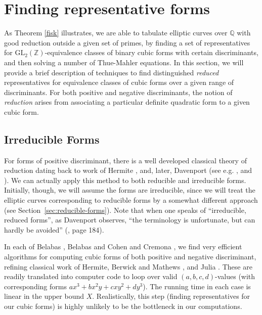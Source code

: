 \documentclass[11pt]{report}
\theoremstyle{definition}
\begin{document}

\section{Finding representative forms}
\label{sec:find-repr-forms}

As Theorem \ref{fisk} illustrates, we are able to tabulate elliptic curves over $\mathbb{Q}$ with good reduction outside a given set of primes,
by finding a set of representatives for $\mbox{GL}_2 ( \mathbb{Z})$-equivalence classes of binary cubic forms with
certain discriminants, and then solving a number of Thue-Mahler equations. In this section, we will provide a brief description of techniques to find
distinguished \emph{reduced} representatives for equivalence classes of cubic forms over a given range of
discriminants. For both positive and negative discriminants, the notion of \emph{reduction} arises from associating a
particular definite quadratic form to a given cubic form.


\subsection{Irreducible Forms}

For forms of positive discriminant, there is a well developed classical theory of reduction dating back to work of
Hermite \cite{Her1}, \cite{Her2} and, later, Davenport (see e.g. \cite{Dav}, \cite{Dav2} and \cite{DaHe}).  We can actually apply
this method to both reducible and irreducible forms. Initially, though, we will assume the forms are irreducible, since we will treat
the elliptic curves corresponding to reducible forms by a somewhat different approach (see Section~\ref{sec:reducible-forms}).
Note that when one speaks of ``irreducible, reduced forms'',
as Davenport observes,
``the terminology is unfortunate, but can hardly be avoided'' (\cite{Dav3}, page 184).

In each of Belabas \cite{Be}, Belabas and Cohen \cite{BeCo} and Cremona
\cite{Cr}, we find very efficient algorithms for computing cubic forms of both positive and negative discriminant, refining classical work of Hermite, Berwick
and Mathews \cite{BeMa}, and Julia \cite{Ju}. These are  readily translated into computer code to loop over valid $(a,b,c,d)$-values (with corresponding forms $ax^3+bx^2y+cxy^2+dy^3$).  The running time in each case is linear in the upper bound $X$.
Realistically, this step (finding representatives for our cubic forms) is highly unlikely to be the bottleneck in our computations.
\end{document}
